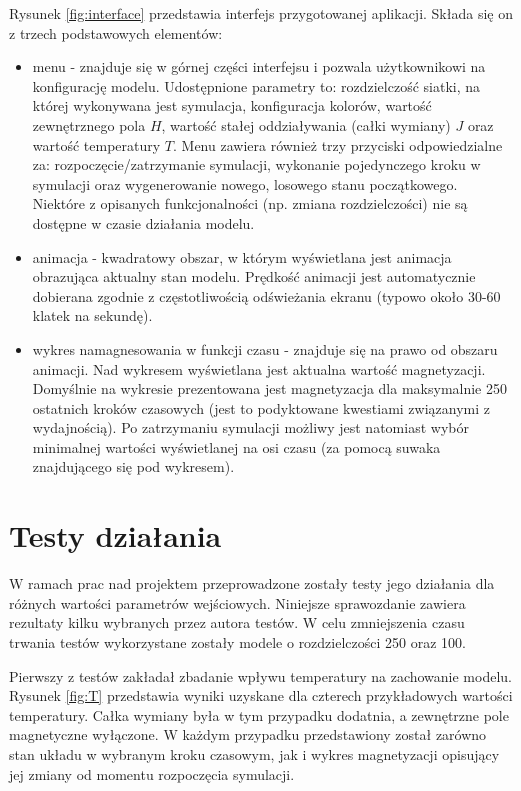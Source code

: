\documentclass[11pt] {article}
\begin{document}
Rysunek \ref{fig:interface} przedstawia interfejs przygotowanej aplikacji. Składa się on z trzech podstawowych elementów: 
\begin{itemize}
\item menu - znajduje się w górnej części interfejsu i pozwala użytkownikowi na konfigurację modelu. Udostępnione parametry to: rozdzielczość siatki, na której wykonywana jest symulacja, konfiguracja kolorów, wartość zewnętrznego pola $H$, wartość stałej oddziaływania (całki wymiany) $J$ oraz wartość temperatury $T$. Menu zawiera również trzy przyciski odpowiedzialne za: rozpoczęcie/zatrzymanie symulacji, wykonanie pojedynczego kroku w symulacji oraz wygenerowanie nowego, losowego stanu początkowego. Niektóre z opisanych funkcjonalności (np. zmiana rozdzielczości) nie są dostępne w czasie działania modelu.

\item animacja - kwadratowy obszar, w którym wyświetlana jest animacja obrazująca aktualny stan modelu. Prędkość animacji jest automatycznie dobierana zgodnie z częstotliwością odświeżania ekranu (typowo około 30-60 klatek na sekundę).

\item wykres namagnesowania w funkcji czasu - znajduje się na prawo od obszaru animacji. Nad wykresem wyświetlana jest aktualna wartość magnetyzacji. Domyślnie na wykresie prezentowana jest magnetyzacja dla maksymalnie 250 ostatnich kroków czasowych (jest to podyktowane kwestiami związanymi z wydajnością). Po zatrzymaniu symulacji możliwy jest natomiast wybór minimalnej wartości wyświetlanej na osi czasu (za pomocą suwaka znajdującego się pod wykresem).
\end{itemize}


\section{Testy działania}
W ramach prac nad projektem przeprowadzone zostały testy jego działania dla różnych wartości parametrów wejściowych. Niniejsze sprawozdanie zawiera rezultaty kilku wybranych przez autora testów. W celu zmniejszenia czasu trwania testów wykorzystane zostały modele o rozdzielczości 250 oraz 100.

\vspace{1.0em} 
Pierwszy z testów zakładał zbadanie wpływu temperatury na zachowanie modelu. Rysunek \ref{fig:T} przedstawia wyniki uzyskane dla czterech przykładowych wartości temperatury. Całka wymiany była w tym przypadku dodatnia, a zewnętrzne pole magnetyczne wyłączone. W każdym przypadku przedstawiony został zarówno stan układu w wybranym kroku czasowym, jak i wykres magnetyzacji opisujący jej zmiany od momentu rozpoczęcia symulacji.
\end{document}
